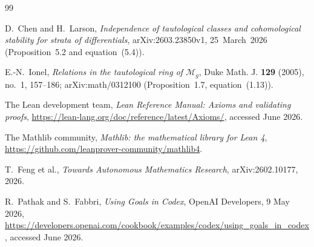 \documentclass[11pt]{article}
\theoremstyle{definition}
\theoremstyle{remark}
\begin{document}
\begin{thebibliography}{99}

D.~Chen and H.~Larson,
\emph{Independence of tautological classes and cohomological stability for
strata of differentials}, arXiv:2603.23850v1, 25~March~2026
(Proposition~5.2 and equation~(5.4)).

E.-N.~Ionel,
\emph{Relations in the tautological ring of $\mathcal M_g$},
Duke Math. J. \textbf{129} (2005), no.~1, 157--186; arXiv:math/0312100
(Proposition~1.7, equation~(1.13)).

The Lean development team,
\emph{Lean Reference Manual: Axioms and validating proofs},
\url{https://lean-lang.org/doc/reference/latest/Axioms/}, accessed June 2026.

The Mathlib community,
\emph{Mathlib: the mathematical library for Lean 4},
\url{https://github.com/leanprover-community/mathlib4}.

T.~Feng et al.,
\emph{Towards Autonomous Mathematics Research},
arXiv:2602.10177, 2026.

R.~Pathak and S.~Fabbri,
\emph{Using Goals in Codex}, OpenAI Developers, 9 May 2026,
\url{https://developers.openai.com/cookbook/examples/codex/using_goals_in_codex},
accessed June 2026.

\end{thebibliography}
\end{document}
